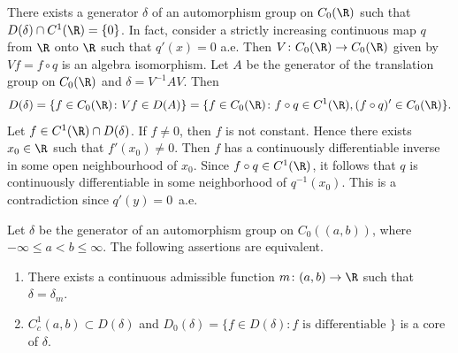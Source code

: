 \begin{example}\label{ex:b2-3.22}
%
There exists a generator $\delta$ of an automorphism group on $C_{0}(\R)$ such that $D(\delta) \cap C^{1}(\R) = \{0\}$.
In fact, consider a strictly increasing continuous map $q$ from $\R$ onto $\R$ such that
$q'(x) = 0$ a.e.
Then $V \colon C_{0}(\R) \to C_{0}(\R)$ given by $Vf = f \circ q$ is an algebra isomorphism.
Let $A$ be the generator of the translation group on $C_{0}(\R)$ and $\delta = V^{-1}AV$.
Then 
\[
D(\delta) = \{ f \in C_{0}(\R) \colon Vf \in D(A)\} = \{f \in C_{0}(\R) \colon f \circ q \in C^{1}(\R), (f \circ q)' \in C_{0}(\R) \}.
\]
Let $f \in C^{1}(\R) \cap D(\delta)$.
If\/ $f \neq 0$, then $f$ is not constant.
Hence there exists $x_{0} \in \R$ such that $f'(x_{0}) \neq 0$.
Then $f$ has a continuously differentiable inverse in some open neighbourhood of\/ $x_{0}$.
Since $f \circ q \in C^{1}(\R)$, it follows that $q$ is continuously differentiable in some neighborhood of\/ $q^{-1}(x_{0})$.
This is a contradiction since $q'(y) = 0$~a.e.
\end{example}
\begin{theorem}\label{thm:b2-3.23}
%
Let $\delta$ be the generator of an automorphism group on $C_{0}((a,b))$, where $-\infty \leq a < b \leq \infty$.
The following assertions are equivalent.
\begin{enumerate}[\upshape (a)]
\item \label{thm:b2-3.23-1} 
There exists a continuous admissible function $m \colon (a,b) \to \R$ such that $\delta = \delta_{m}$.
\item \label{thm:b2-3.23-2}
$C_{c}^{1}(a,b) \subset D(\delta)$ and $D_{0}(\delta) = \{ f \in D(\delta) \colon f \text{ is differentiable } \}$ is a core of\/ $\delta$.
\end{enumerate}
\end{theorem}
